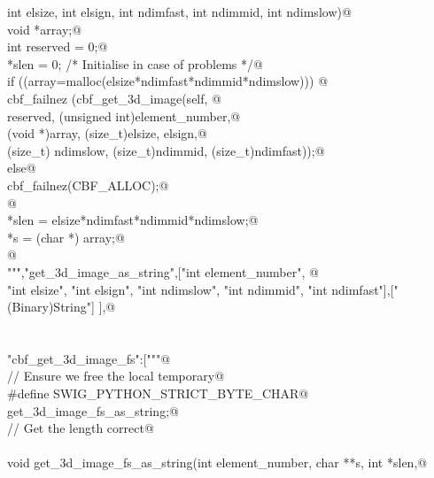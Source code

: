 \documentclass[10pt,a4paper,twoside,notitlepage]{article}
\begin{document}
\begin{flushleft}
\begin{list}{}{}
\mbox{}\verb@    int elsize, int elsign, int ndimfast, int ndimmid, int ndimslow){@\\
\mbox{}\verb@        void *array;@\\
\mbox{}\verb@        int reserved = 0;@\\
\mbox{}\verb@        *slen = 0; /* Initialise in case of problems */@\\
\mbox{}\verb@        if ((array=malloc(elsize*ndimfast*ndimmid*ndimslow))) {@\\
\mbox{}\verb@               cbf_failnez (cbf_get_3d_image(self, @\\
\mbox{}\verb@               reserved, (unsigned int)element_number,@\\
\mbox{}\verb@               (void *)array, (size_t)elsize, elsign,@\\
\mbox{}\verb@               (size_t) ndimslow, (size_t)ndimmid, (size_t)ndimfast));@\\
\mbox{}\verb@         }else{@\\
\mbox{}\verb@               cbf_failnez(CBF_ALLOC);@\\
\mbox{}\verb@         }@\\
\mbox{}\verb@        *slen = elsize*ndimfast*ndimmid*ndimslow;@\\
\mbox{}\verb@        *s = (char *) array;@\\
\mbox{}\verb@      }@\\
\mbox{}\verb@""","get_3d_image_as_string",["int element_number", @\\
\mbox{}\verb@    "int elsize", "int elsign", "int ndimslow", "int ndimmid", "int ndimfast"],["(Binary)String"] ],@\\
\mbox{}\verb@@\\
\mbox{}\verb@@\\
\mbox{}\verb@"cbf_get_3d_image_fs":["""@\\
\mbox{}\verb@// Ensure we free the local temporary@\\
\mbox{}\verb@%{@\\
\mbox{}\verb@#define SWIG_PYTHON_STRICT_BYTE_CHAR@\\
\mbox{}\verb@%}@\\
\mbox{}\verb@%cstring_output_allocate_size(char ** s, int *slen, free(*$1))@\\
\mbox{}\verb@       get_3d_image_fs_as_string;@\\
\mbox{}\verb@// Get the length correct@\\
\mbox{}\verb@@\\
\mbox{}\verb@    void get_3d_image_fs_as_string(int element_number, char **s, int *slen,@\\

\end{list}
\end{flushleft}
\end{document}
